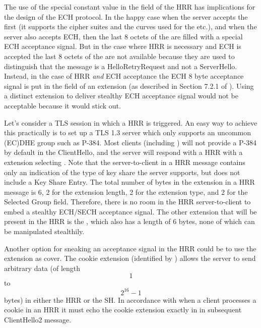 The use of the special constant value in the  field of the HRR has implications for the design of the ECH protocol. In the happy case when the server accepts the first  (it supports the cipher suites and the curves used for the  etc.), and when the server also accepts ECH, then the last 8 octets of the  are filled with a special ECH acceptance signal. But in the case where HRR is necessary and ECH is accepted the last 8 octets of the  are not available because they are used to distinguish that the message is a HelloRetryRequest and not a ServerHello. Instead, in the case of HRR {\em and} ECH acceptance the ECH 8 byte acceptance signal is put in the  field of an  extension (as described in Section 7.2.1 of \cite{esni}). Using a distinct extension to deliver stealthy ECH acceptance signal would not be acceptable because it would stick out.

Let's consider a TLS session in which a HRR is triggered. An easy way to achieve this practically is to set up a TLS 1.3 server which only supports an uncommon (EC)DHE group such as P-384. Most clients (including ) will not provide a P-384  by default in the ClientHello, and the server will respond with a HRR with a  extension selecting . Note that the server-to-client  in a HRR message contains only an indication of the type of key share the server supports, but does not include a Key Share Entry. The total number of bytes in the  extension in a HRR message is 6, 2 for the extension length, 2 for the extension type, and 2 for the Selected Group field. Therefore, there is no room in the HRR server-to-client  to embed a stealthy ECH/SECH acceptance signal. The other extension that will be present in the HRR is the , which also has a length of 6 bytes, none of which can be manipulated stealthily.

Another option for sneaking an acceptance signal in the HRR could be to use the  extension as cover. The cookie extension (identified by ) allows the server to send arbitrary data (of length \[1\] to \[2^{16}-1\] bytes) in either the HRR or the SH. In accordance with  when a client processes a cookie in an HRR it must echo the cookie extension exactly in in subsequent ClientHello2 message.

